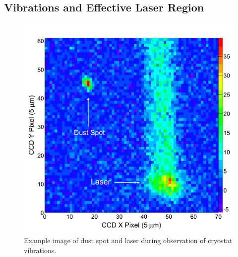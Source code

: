 
\subsection{Vibrations and Effective Laser Region}

\begin{figure} %
        \centering
                \includegraphics[width=.6\textwidth]{figures/image_dustspot.png}
                \caption{Example image of dust spot and laser during observation of cryostat vibrations.}
\label{fig:dustspot}
\end{figure}

